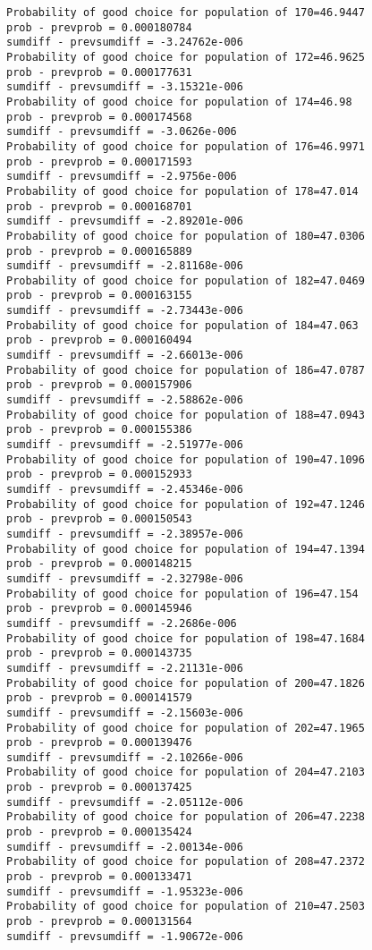 \documentclass[11pt,onecolumn]{article}
\begin{document}
\begin{verbatim}
Probability of good choice for population of 170=46.9447
prob - prevprob = 0.000180784
sumdiff - prevsumdiff = -3.24762e-006
Probability of good choice for population of 172=46.9625
prob - prevprob = 0.000177631
sumdiff - prevsumdiff = -3.15321e-006
Probability of good choice for population of 174=46.98
prob - prevprob = 0.000174568
sumdiff - prevsumdiff = -3.0626e-006
Probability of good choice for population of 176=46.9971
prob - prevprob = 0.000171593
sumdiff - prevsumdiff = -2.9756e-006
Probability of good choice for population of 178=47.014
prob - prevprob = 0.000168701
sumdiff - prevsumdiff = -2.89201e-006
Probability of good choice for population of 180=47.0306
prob - prevprob = 0.000165889
sumdiff - prevsumdiff = -2.81168e-006
Probability of good choice for population of 182=47.0469
prob - prevprob = 0.000163155
sumdiff - prevsumdiff = -2.73443e-006
Probability of good choice for population of 184=47.063
prob - prevprob = 0.000160494
sumdiff - prevsumdiff = -2.66013e-006
Probability of good choice for population of 186=47.0787
prob - prevprob = 0.000157906
sumdiff - prevsumdiff = -2.58862e-006
Probability of good choice for population of 188=47.0943
prob - prevprob = 0.000155386
sumdiff - prevsumdiff = -2.51977e-006
Probability of good choice for population of 190=47.1096
prob - prevprob = 0.000152933
sumdiff - prevsumdiff = -2.45346e-006
Probability of good choice for population of 192=47.1246
prob - prevprob = 0.000150543
sumdiff - prevsumdiff = -2.38957e-006
Probability of good choice for population of 194=47.1394
prob - prevprob = 0.000148215
sumdiff - prevsumdiff = -2.32798e-006
Probability of good choice for population of 196=47.154
prob - prevprob = 0.000145946
sumdiff - prevsumdiff = -2.2686e-006
Probability of good choice for population of 198=47.1684
prob - prevprob = 0.000143735
sumdiff - prevsumdiff = -2.21131e-006
Probability of good choice for population of 200=47.1826
prob - prevprob = 0.000141579
sumdiff - prevsumdiff = -2.15603e-006
Probability of good choice for population of 202=47.1965
prob - prevprob = 0.000139476
sumdiff - prevsumdiff = -2.10266e-006
Probability of good choice for population of 204=47.2103
prob - prevprob = 0.000137425
sumdiff - prevsumdiff = -2.05112e-006
Probability of good choice for population of 206=47.2238
prob - prevprob = 0.000135424
sumdiff - prevsumdiff = -2.00134e-006
Probability of good choice for population of 208=47.2372
prob - prevprob = 0.000133471
sumdiff - prevsumdiff = -1.95323e-006
Probability of good choice for population of 210=47.2503
prob - prevprob = 0.000131564
sumdiff - prevsumdiff = -1.90672e-006

\end{verbatim}
\end{document}
